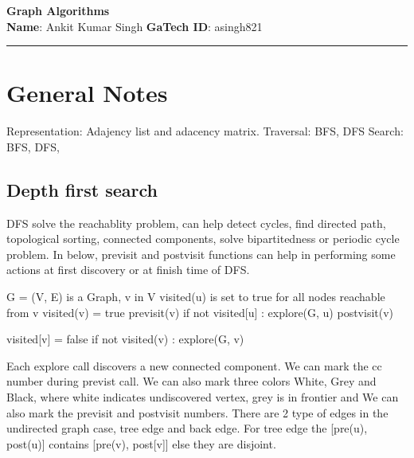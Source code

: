 \documentclass[11pt,letterpaper]{article}
\begin{document}
\pagestyle{plain}
 
\begin{center}
\textbf{\large Graph Algorithms}\\
\textbf{Name}: Ankit Kumar Singh
\hspace{8cm}
\textbf{GaTech ID}: asingh821
\end{center}
\hrule

\section{General Notes}
Representation: Adajency list and adacency matrix. 
Traversal: BFS, DFS
Search: BFS, DFS, 

\subsection{Depth first search}
DFS solve the reachablity problem, can help detect cycles, find directed path, topological sorting, connected components, solve bipartitedness or periodic cycle problem. In below, previsit and postvisit functions can help in performing some actions at first discovery or at finish time of DFS. 

\begin{algorithm}
	\algrenewcommand{}
	\algrenewcommand{}
	\caption{}
	\begin{algorithmic}[1]
		\Require G = (V, E) is a Graph, v in V
		\Ensure visited(u) is set to true for all nodes reachable from v
		\State visited(v) = true
		\State previsit(v)
			\State if not visited[u] : explore(G, u)
		\EndFor 
		\State postvisit(v)
	\end{algorithmic}
\end{algorithm}


\begin{algorithm}
	\caption{}
	\begin{algorithmic}[1]
			\State visited[v] = false
		\EndFor
			\State if not visited(v) : explore(G, v)
		\EndFor
	\end{algorithmic}
\end{algorithm}


Each explore call discovers a new connected component. We can mark the cc number during previst call. We can also mark three colors White, Grey and Black, where white indicates undiscovered vertex, grey is in frontier and We can also mark the previsit and postvisit numbers. There are 2 type of edges in the undirected graph case, tree edge and back edge. For tree edge the [pre(u), post(u)] contains [pre(v), post[v]] else they are disjoint. 
\end{document}
